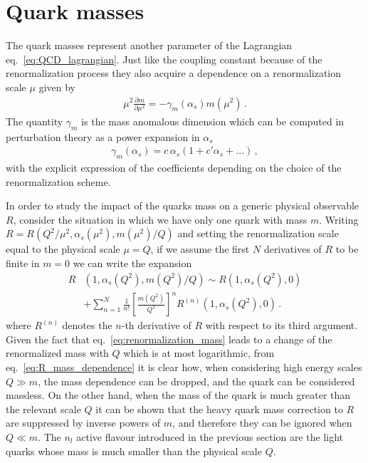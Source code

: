 \section{Quark masses}
\label{sec:quark_masses}
The quark masses represent another parameter of the Lagrangian eq.~\eqref{eq:QCD_lagrangian}.
Just like the coupling constant because of the renormalization process they also acquire a
dependence on a renormalization scale $\mu$ given by 
\begin{align}
    \label{eq:renormalization_mass}
    \mu^2\frac{\partial m }{\partial \mu^2} = - \gamma_m\left(\alpha_s\right)m\left(\mu^2\right)\,.
\end{align}
The quantity $\gamma_m$ is the mass anomalous dimension which can be computed in perturbation theory as
a power expansion in $\alpha_s$
\begin{align}
    \gamma_m\left(\alpha_s\right) = c\,\alpha_s\left(1+c'\alpha_s + ...\right)\,,
\end{align}
with the explicit expression of the coefficients depending on the choice of the renormalization scheme.

%
In order to study the impact of the quarks mass on a generic physical observable $R$, consider
the situation in which we have only one quark with mass $m$.
Writing $R = R\left(Q^2/\mu^2, \alpha_s\left(\mu^2\right),m\left(\mu^2\right)/Q \right)$ 
and setting the renormalization scale equal to the physical scale $\mu=Q$,
if we assume the first $N$ derivatives of $R$ to be finite in $m=0$ 
we can write the expansion
\begin{align}
    \label{eq:R_mass_dependence}
    R&\left(1, \alpha_s\left(Q^2\right),m\left(Q^2\right)/Q \right) \sim
    R\left(1, \alpha_s\left(Q^2\right),0 \right)\nonumber \\
    & + \sum_{n=1}^{N}\frac{1}{n!}\left[\frac{m\left(Q^2\right)}{Q^2}\right]^n R^{(n)}\left(1,\alpha_s\left(Q^2\right),0\right)\,.
\end{align}
where $R^{(n)}$ denotes the $n$-th derivative of $R$ with respect to its third argument. 
Given the fact that eq.~\eqref{eq:renormalization_mass} leads to a change of the renormalized mass with $Q$ 
which is at most logarithmic, from eq.~\eqref{eq:R_mass_dependence} it is clear how, when considering 
high energy scales $Q \gg m$, the mass dependence can be dropped, and the quark can be considered massless.
%
On the other hand, when the mass of the quark is much greater than the relevant scale $Q$ it can be shown 
that the heavy quark mass correction to $R$ are suppressed by inverse powers of $m$, and therefore they can be ignored when
$Q \ll m$. 
%
The $n_l$ active flavour introduced in the previous section are the light quarks whose mass is much smaller than
the physical scale $Q$.

